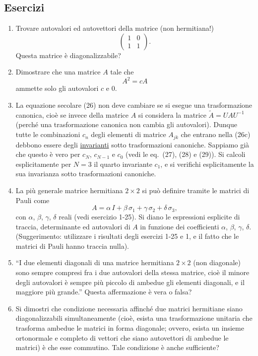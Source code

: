 \documentclass[11pt, a4paper]{book}
\numberwithin{equation}{section}
\newenvironment{esercizi}{\subsection*{Esercizi}\begin{enumerate}}{\end{enumerate}}
\begin{document}
\begin{esercizi}
\item Trovare autovalori ed autovettori della matrice (non hermitiana!)
\[
\begin{pmatrix} 1 & 0 \\ 1 & 1 \end{pmatrix}.
\]
Questa matrice è diagonalizzabile?

\item Dimostrare che una matrice $A$ tale che
\[
A^2 = cA
\]
ammette solo gli autovalori $c$ e $0$.

\item La equazione secolare (26) non deve cambiare se si esegue una
trasformazione canonica, cioè se invece della matrice $A$ si considera la
matrice $\widetilde{A} = UAU^{-1}$ (perché una trasformazione canonica non
cambia gli autovalori). Dunque tutte le combinazioni $c_n$ degli elementi
di matrice $A_{jk}$ che entrano nella (26c) debbono essere degli
\uline{invarianti} sotto trasformazioni canoniche. Sappiamo già che
questo è vero per $c_N$, $c_{N-1}$ e $c_0$ (vedi le eq.\ (27), (28) e
(29)). Si calcoli esplicitamente per $N=3$ il quarto invariante $c_1$, e
si verifichi esplicitamente la sua invarianza sotto trasformazioni
canoniche.

\item La più generale matrice hermitiana $2\times2$ si può definire tramite
le matrici di Pauli come
\[
A = \alpha\, I + \beta\,\sigma_1 + \gamma\,\sigma_2 + \delta\,\sigma_3,
\]
con $\alpha$, $\beta$, $\gamma$, $\delta$ reali (vedi esercizio 1-25). Si
diano le espressioni esplicite di traccia, determinante ed autovalori di
$A$ in funzione dei coefficienti $\alpha$, $\beta$, $\gamma$, $\delta$.
(Suggerimento: utilizzare i risultati degli esercizi 1-25 e 1, e il fatto
che le matrici di Pauli hanno traccia nulla).

\item ``I due elementi diagonali di una matrice hermitiana $2\times2$ (non
diagonale) sono sempre compresi fra i due autovalori della stessa matrice,
cioè il minore degli autovalori è sempre più piccolo di ambedue gli
elementi diagonali, e il maggiore più grande.'' Questa affermazione è vera
o falsa?

\item Si dimostri che condizione necessaria affinché due matrici hermitiane
siano diagonalizzabili simultaneamente (cioè, esista una trasformazione
unitaria che trasforma ambedue le matrici in forma diagonale; ovvero,
esista un insieme ortonormale e completo di vettori che siano autovettori
di ambedue le matrici) è che esse commutino. Tale condizione è anche
sufficiente?


\end{esercizi}
\end{document}
